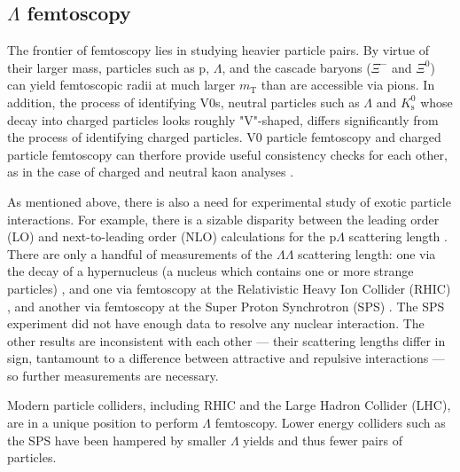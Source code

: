 \subsection{$\Lambda$ femtoscopy}
\label{sec:LambdaFemto}

The frontier of femtoscopy lies in studying heavier particle pairs.
By virtue of their larger mass, particles such as p, $\Lambda$, and the cascade baryons ($\Xi^-$ and $\Xi^0$) can yield femtoscopic radii at much larger $m_\mathrm{T}$ than are accessible via pions.
In addition, the process of identifying V0s, neutral particles such as $\Lambda$ and $K^0_\mathrm{s}$ whose decay into charged particles looks roughly "V"-shaped, differs significantly from the process of identifying charged particles.
V0 particle femtoscopy and charged particle femtoscopy can therfore provide useful consistency checks for each other, as in the case of charged and neutral kaon analyses \cite{Adam:2015vja}.

As mentioned above, there is also a need for experimental study of exotic particle interactions.
For example, there is a sizable disparity between the leading order (LO) and next-to-leading order (NLO) calculations for the p$\Lambda$ scattering length \cite{...,...}.
There are only a handful of measurements of the $\Lambda\Lambda$ scattering length: one via the decay of a hypernucleus (a nucleus which contains one or more strange particles) \cite{Takahashi:2001nm,Filikhin:2002wm,Hiyama:2002yj}, and one via femtoscopy at the Relativistic Heavy Ion Collider (RHIC) \cite{Adamczyk:2014vca}, and another via femtoscopy at the Super Proton Synchrotron (SPS) \cite{Andersen:1999gq}.
The SPS experiment did not have enough data to resolve any nuclear interaction.
The other results are inconsistent with each other --- their scattering lengths differ in sign, tantamount to a difference between attractive and repulsive interactions --- so further measurements are necessary.

Modern particle colliders, including RHIC and the Large Hadron Collider (LHC), are in a unique position to perform $\Lambda$ femtoscopy.
Lower energy colliders such as the SPS have been hampered by smaller $\Lambda$ yields and thus fewer pairs of particles.






